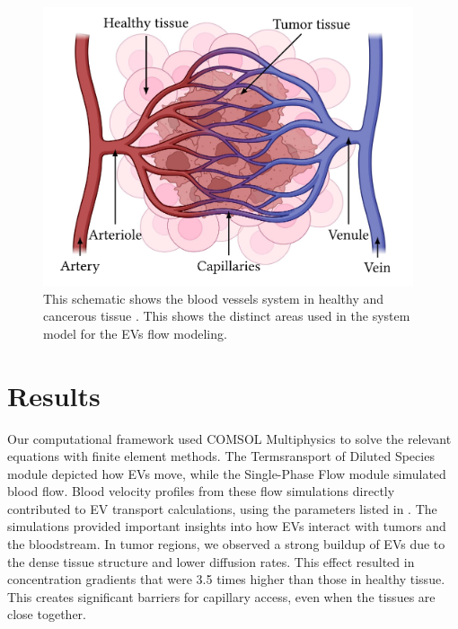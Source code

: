 \documentclass[sigconf]{acmart}
\begin{document}
 \begin{figure}[h]
   \centering
   \includegraphics[width=\linewidth]{pictures/schematic_bloodvessels.png}
   \caption{This schematic shows the blood vessels system in healthy and cancerous tissue \cite{Zoofaghari_2023}. This shows the distinct areas used in the system model for the EVs flow modeling.}
   \Description{}
 \end{figure}


\section{Results}
\label{sec: num-results}
Our computational framework used COMSOL Multiphysics to solve the relevant equations with finite element methods. The Termsransport of Diluted Species module depicted how EVs move, while the Single-Phase Flow module simulated blood flow. Blood velocity profiles from these flow simulations directly contributed to EV transport calculations, using the parameters listed in \cite{Zoofaghari_2023}. The simulations provided important insights into how EVs interact with tumors and the bloodstream. In tumor regions, we observed a strong buildup of EVs due to the dense tissue structure and lower diffusion rates. This effect resulted in concentration gradients that were 3.5 times higher than those in healthy tissue. This creates significant barriers for capillary access, even when the tissues are close together. 
\end{document}

